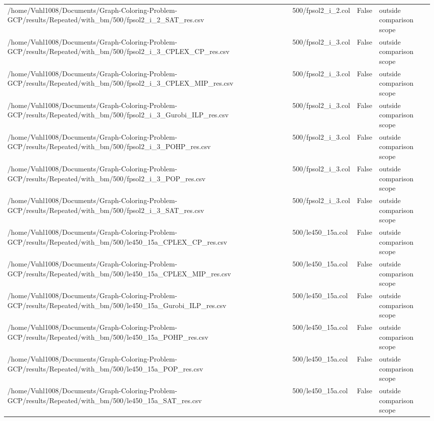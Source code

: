 \begin{table}[htbp]
\begin{tabular}{llll}
/home/Vuhl1008/Documents/Graph-Coloring-Problem-GCP/results/Repeated/with\_bm/500/fpsol2\_i\_2\_SAT\_res.csv & 500/fpsol2\_i\_2.col & False & outside comparison scope \\
/home/Vuhl1008/Documents/Graph-Coloring-Problem-GCP/results/Repeated/with\_bm/500/fpsol2\_i\_3\_CPLEX\_CP\_res.csv & 500/fpsol2\_i\_3.col & False & outside comparison scope \\
/home/Vuhl1008/Documents/Graph-Coloring-Problem-GCP/results/Repeated/with\_bm/500/fpsol2\_i\_3\_CPLEX\_MIP\_res.csv & 500/fpsol2\_i\_3.col & False & outside comparison scope \\
/home/Vuhl1008/Documents/Graph-Coloring-Problem-GCP/results/Repeated/with\_bm/500/fpsol2\_i\_3\_Gurobi\_ILP\_res.csv & 500/fpsol2\_i\_3.col & False & outside comparison scope \\
/home/Vuhl1008/Documents/Graph-Coloring-Problem-GCP/results/Repeated/with\_bm/500/fpsol2\_i\_3\_POHP\_res.csv & 500/fpsol2\_i\_3.col & False & outside comparison scope \\
/home/Vuhl1008/Documents/Graph-Coloring-Problem-GCP/results/Repeated/with\_bm/500/fpsol2\_i\_3\_POP\_res.csv & 500/fpsol2\_i\_3.col & False & outside comparison scope \\
/home/Vuhl1008/Documents/Graph-Coloring-Problem-GCP/results/Repeated/with\_bm/500/fpsol2\_i\_3\_SAT\_res.csv & 500/fpsol2\_i\_3.col & False & outside comparison scope \\
/home/Vuhl1008/Documents/Graph-Coloring-Problem-GCP/results/Repeated/with\_bm/500/le450\_15a\_CPLEX\_CP\_res.csv & 500/le450\_15a.col & False & outside comparison scope \\
/home/Vuhl1008/Documents/Graph-Coloring-Problem-GCP/results/Repeated/with\_bm/500/le450\_15a\_CPLEX\_MIP\_res.csv & 500/le450\_15a.col & False & outside comparison scope \\
/home/Vuhl1008/Documents/Graph-Coloring-Problem-GCP/results/Repeated/with\_bm/500/le450\_15a\_Gurobi\_ILP\_res.csv & 500/le450\_15a.col & False & outside comparison scope \\
/home/Vuhl1008/Documents/Graph-Coloring-Problem-GCP/results/Repeated/with\_bm/500/le450\_15a\_POHP\_res.csv & 500/le450\_15a.col & False & outside comparison scope \\
/home/Vuhl1008/Documents/Graph-Coloring-Problem-GCP/results/Repeated/with\_bm/500/le450\_15a\_POP\_res.csv & 500/le450\_15a.col & False & outside comparison scope \\
/home/Vuhl1008/Documents/Graph-Coloring-Problem-GCP/results/Repeated/with\_bm/500/le450\_15a\_SAT\_res.csv & 500/le450\_15a.col & False & outside comparison scope \\

\end{tabular}
\end{table}
